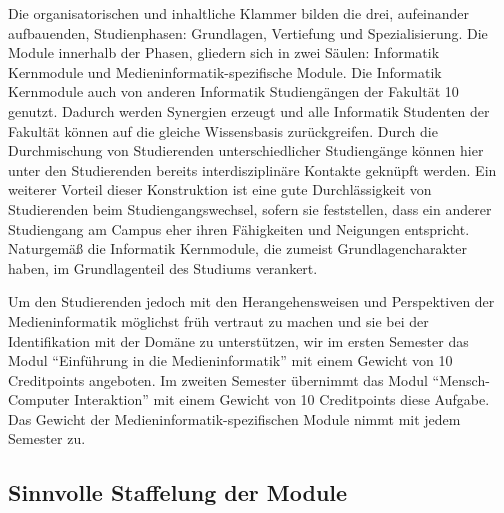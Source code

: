 Die organisatorischen und inhaltliche Klammer bilden die drei,
aufeinander aufbauenden, Studienphasen: Grundlagen, Vertiefung und
Spezialisierung. Die Module innerhalb der Phasen, gliedern sich in zwei
Säulen: Informatik Kernmodule und Medieninformatik-spezifische Module.
Die Informatik Kernmodule auch von anderen Informatik Studiengängen der
Fakultät 10 genutzt. Dadurch werden Synergien erzeugt und alle
Informatik Studenten der Fakultät können auf die gleiche Wissensbasis
zurückgreifen. Durch die Durchmischung von Studierenden
unterschiedlicher Studiengänge können hier unter den Studierenden
bereits interdisziplinäre Kontakte geknüpft werden. Ein weiterer Vorteil
dieser Konstruktion ist eine gute Durchlässigkeit von Studierenden beim
Studiengangswechsel, sofern sie feststellen, dass ein anderer
Studiengang am Campus eher ihren Fähigkeiten und Neigungen entspricht.
Naturgemäß die Informatik Kernmodule, die zumeist Grundlagencharakter
haben, im Grundlagenteil des Studiums verankert.

Um den Studierenden jedoch mit den Herangehensweisen und Perspektiven
der Medieninformatik möglichst früh vertraut zu machen und sie bei der
Identifikation mit der Domäne zu unterstützen, wir im ersten Semester
das Modul ``Einführung in die Medieninformatik'' mit einem Gewicht von
10 Creditpoints angeboten. Im zweiten Semester übernimmt das Modul
``Mensch-Computer Interaktion'' mit einem Gewicht von 10 Creditpoints
diese Aufgabe. Das Gewicht der Medieninformatik-spezifischen Module
nimmt mit jedem Semester zu.

\subsection{Sinnvolle Staffelung der
Module}\label{sinnvolle-staffelung-der-module}


